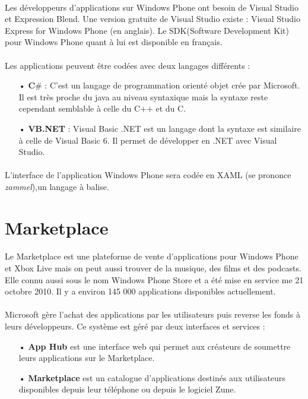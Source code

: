 \documentclass[twoside,UTF8]{EPURapport}
\begin{document}
\paragraph{}
Les développeurs d'applications sur Windows Phone ont besoin de Visual Studio et Expression Blend. Une version gratuite de Visual Studio existe : Visual Studio Express for Windows Phone (en anglais). Le SDK(Software Development Kit) pour Windows Phone quant à lui est disponible en français. 

\paragraph{}
Les applications peuvent être codées avec deux langages différents : 
\begin{itemize}
	\item[•]\textbf{C$\#$} : C'est un langage de programmation orienté objet crée par Microsoft. Il est très proche du java au niveau syntaxique mais la syntaxe reste cependant semblable à celle du C++ et du C. 
	\item[•]\textbf{VB.NET} : Visual Basic .NET est un langage dont la syntaxe est similaire à celle de Visual Basic 6. Il permet de développer en .NET avec Visual Studio.
\end{itemize}

\paragraph{}
L'interface de l'application Windows Phone sera codée en XAML (se prononce \textit{zammel}),un langage à balise.  

\section{Marketplace}

\paragraph{}
Le Marketplace  est une plateforme de vente d'applications pour Windows Phone et Xbox Live mais on peut aussi trouver de la musique, des films et des podcasts. Elle connu aussi sous le nom Windows Phone Store et a été mise en service me 21 octobre 2010. Il y a environ 145 000 applications disponibles actuellement.

\paragraph{}
Microsoft gère l'achat des applications par les utilisateurs puis reverse les fonds à leurs développeurs. Ce système est géré par deux interfaces et services : 
\begin{itemize}
	\item[•] \textbf{App Hub} est une interface web qui permet aux créateurs de soumettre leurs applications sur le Marketplace.
	\item[•]\textbf{Marketplace} est un catalogue d'applications destinés aux utilisateurs disponibles depuis leur téléphone ou depuis le logiciel Zune.
\end{itemize}
\end{document}
